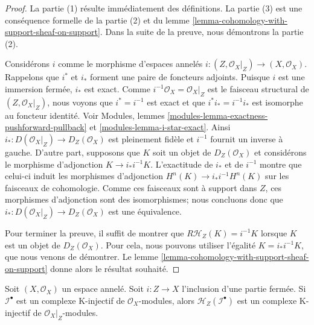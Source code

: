 \begin{proof}
La partie (1) résulte immédiatement des définitions. La partie (3) est une conséquence formelle de la partie (2) et du lemme \ref{lemma-cohomology-with-support-sheaf-on-support}. Dans la suite de la preuve, nous démontrons la partie (2).

\medskip\noindent

Considérons $i$ comme le morphisme d'espaces annelés
$i : (Z, \mathcal{O}_X|_Z) \to (X, \mathcal{O}_X)$. Rappelons que $i^*$ et $i_*$ forment une paire de foncteurs adjoints. Puisque $i$ est une immersion fermée, $i_*$ est exact. Comme $i^{-1}\mathcal{O}_X = \mathcal{O}_X|_Z$ est le faisceau structural de $(Z, \mathcal{O}_X|_Z)$, nous voyons que $i^* = i^{-1}$
est exact et que $i^*i_* = i^{-1}i_*$
est isomorphe au foncteur identité. Voir Modules, lemmes \ref{modules-lemma-exactness-pushforward-pullback} et
\ref{modules-lemma-i-star-exact}. Ainsi
$i_* : D(\mathcal{O}_X|_Z) \to D_Z(\mathcal{O}_X)$
est pleinement fidèle et $i^{-1}$ fournit un inverse à gauche. D'autre part, supposons que $K$ soit un objet de
$D_Z(\mathcal{O}_X)$ et considérons le morphisme d'adjonction
$K \to i_*i^{-1}K$. L'exactitude de $i_*$ et de $i^{-1}$ montre que celui-ci induit les morphismes d'adjonction
$H^n(K) \to i_*i^{-1}H^n(K)$ sur les faisceaux de cohomologie. Comme ces faisceaux sont à support dans $Z$, ces morphismes d'adjonction sont des isomorphismes; nous concluons donc que $i_* : D(\mathcal{O}_X|_Z) \to D_Z(\mathcal{O}_X)$
est une équivalence.

\medskip\noindent

Pour terminer la preuve, il suffit de montrer que $R\mathcal{H}_Z(K) = i^{-1}K$ lorsque
$K$ est un objet de $D_Z(\mathcal{O}_X)$. Pour cela, nous pouvons utiliser l'égalité
$K = i_*i^{-1}K$, que nous venons de démontrer. Le lemme \ref{lemma-cohomology-with-support-sheaf-on-support}
donne alors le résultat souhaité.

\end{proof}

\begin{lemma}

\label{lemma-sections-with-support-K-injective}
Soit $(X, \mathcal{O}_X)$ un espace annelé. Soit $i : Z \to X$ l'inclusion d'une partie fermée. Si $\mathcal{I}^\bullet$ est un complexe K-injectif de $\mathcal{O}_X$-modules, alors $\mathcal{H}_Z(\mathcal{I}^\bullet)$ est un complexe K-injectif de $\mathcal{O}_X|_Z$-modules.
\end{lemma}

